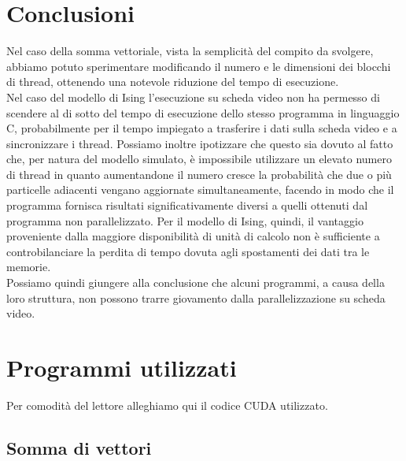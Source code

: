 \documentclass[a4paper,11pt]{article}
\begin{document}
\section{Conclusioni}
Nel caso della somma vettoriale, vista la semplicità del compito da svolgere, abbiamo potuto sperimentare modificando il numero e le dimensioni dei blocchi di thread, ottenendo una notevole riduzione del tempo di esecuzione. \\
Nel caso del modello di Ising l'esecuzione su scheda video non ha permesso di scendere al di sotto del tempo di esecuzione dello stesso programma in linguaggio C, probabilmente per il tempo impiegato a trasferire i dati sulla scheda video e a sincronizzare i thread. Possiamo inoltre ipotizzare che questo sia dovuto al fatto che, per natura del modello simulato, è impossibile utilizzare un elevato numero di thread in quanto aumentandone il numero cresce la probabilità che due o più particelle adiacenti vengano aggiornate simultaneamente, facendo in modo che il programma fornisca risultati significativamente diversi a quelli ottenuti dal programma non parallelizzato. Per il modello di Ising, quindi, il vantaggio proveniente dalla maggiore disponibilità di unità di calcolo non è sufficiente a controbilanciare la perdita di tempo dovuta agli spostamenti dei dati tra le memorie.\\
Possiamo quindi giungere alla conclusione che alcuni programmi, a causa della loro struttura, non possono trarre giovamento dalla parallelizzazione su scheda video.




\section{Programmi utilizzati}

Per comodità del lettore alleghiamo qui il codice CUDA utilizzato.

\subsection{Somma di vettori}
\end{document}
